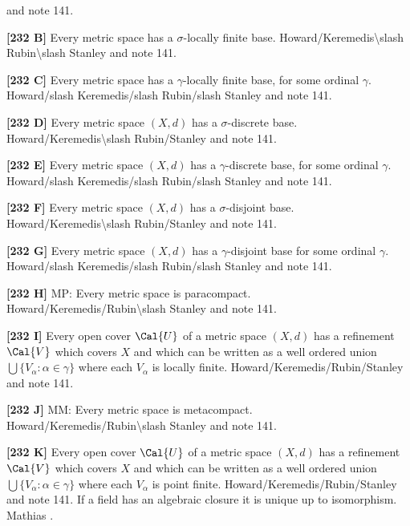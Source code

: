 \cite{1999} and note 141.
\smallskip
\item{}{\bf [232 B]} Every metric space  has a $\sigma$-locally finite
base. \ac{Howard/Keremedis\slash Rubin\slash Stanley} \cite{1999} and
note 141.
\smallskip
\item{}{\bf [232 C]} Every metric space  has a $\gamma$-locally finite base,
for some ordinal $\gamma$. \ac{Howard/slash Keremedis/slash Rubin/slash
Stanley} \cite{1999}
and note 141.
\smallskip
\item{}{\bf [232 D]} Every metric space $(X,d)$ has a $\sigma$-discrete
base. \ac{Howard/Keremedis\slash Rubin/Stanley} \cite{1999} and note 141.
\smallskip
\item{}{\bf [232 E]}  Every metric space $(X,d)$ has a $\gamma$-discrete
base, for some ordinal $\gamma$. \ac{Howard/slash Keremedis/slash
Rubin/slash Stanley} \cite{1999} and note 141.
\smallskip
\item{}{\bf [232 F]} Every metric space $(X,d)$ has a $\sigma$-disjoint
base. \ac{Howard/Keremedis\slash Rubin/Stanley} \cite{1999} and note 141.
\smallskip
\item{}{\bf [232 G]} Every metric space $(X,d)$ has a $\gamma$-disjoint
base for some ordinal $\gamma$. \ac{Howard/slash Keremedis/slash
Rubin/slash Stanley} \cite{1999} and note 141.
\smallskip
\item{}{\bf [232 H]} MP: Every metric space is paracompact.
\ac{Howard/Keremedis/Rubin\slash Stanley} \cite{1999} and note 141.
\smallskip
\item{}{\bf [232 I]} Every open cover $\Cal{U}$ of a metric space $(X,d)$
has a refinement $\Cal{V}$ which covers $X$ and which can be written as a
well ordered union $\bigcup \{V_\alpha :\alpha\in\gamma\}$ where each
$V_\alpha$ is locally finite. \ac{Howard/Keremedis/Rubin/Stanley}
\cite{1999} and note 141.
\smallskip
\item{}{\bf [232 J]} MM: Every metric space is metacompact.
\ac{Howard/Keremedis/Rubin\slash Stanley} \cite{1999} and note 141.
\smallskip
\item{}{\bf [232 K]} Every open cover $\Cal{U}$ of a metric space $(X,d)$
has a refinement $\Cal{V}$ which covers $X$ and which can be written as a
well ordered union $\bigcup \{V_\alpha :\alpha\in\gamma\}$ where each
$V_\alpha $ is point finite. \ac{Howard/Keremedis/Rubin/Stanley}
\cite{1999} and note 141.
\medskip
{} If a field has an algebraic closure it is unique
up to isomorphism. \ac{Mathias} \cite{1977b}. 

